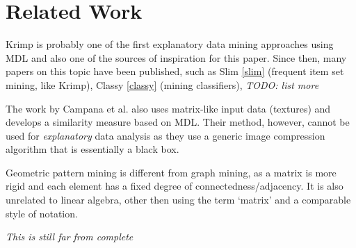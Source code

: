 \documentclass{llncs}
\begin{document}
\section{Related Work}

Krimp \cite{krimp} is probably one of the first explanatory data mining approaches using MDL and also one of the sources of inspiration for this paper. Since then, many papers on this topic have been published, such as Slim \ref{slim} (frequent item set mining, like Krimp), Classy \ref{classy} (mining classifiers), \emph{TODO: list more}

The work by Campana et al. \cite{campana2010compression} also uses matrix-like input data (textures) and develops a similarity measure based on MDL. Their method, however, cannot be used for \emph{explanatory} data analysis as they use a generic image compression algorithm that is essentially a black box.

Geometric pattern mining is different from graph mining, as a matrix is more rigid and each element has a fixed degree of connectedness/adjacency. It is also unrelated to linear algebra, other then using the term `matrix' and a comparable style of notation. 

\emph{This is still far from complete}
\end{document}
